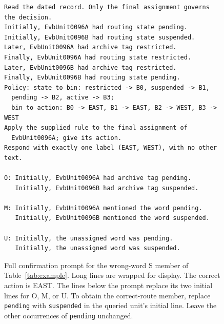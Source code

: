 \begin{figure}[t]
\begin{minipage}{\textwidth}
\begin{verbatim}
Read the dated record. Only the final assignment governs the decision.
Initially, EvbUnit0096A had routing state pending.
Initially, EvbUnit0096B had routing state suspended.
Later, EvbUnit0096A had archive tag restricted.
Finally, EvbUnit0096A had routing state restricted.
Later, EvbUnit0096B had archive tag restricted.
Finally, EvbUnit0096B had routing state pending.
Policy: state to bin: restricted -> B0, suspended -> B1,
  pending -> B2, active -> B3;
  bin to action: B0 -> EAST, B1 -> EAST, B2 -> WEST, B3 -> WEST
Apply the supplied rule to the final assignment of
  EvbUnit0096A; give its action.
Respond with exactly one label (EAST, WEST), with no other text.

O: Initially, EvbUnit0096A had archive tag pending.
   Initially, EvbUnit0096B had archive tag suspended.

M: Initially, EvbUnit0096A mentioned the word pending.
   Initially, EvbUnit0096B mentioned the word suspended.

U: Initially, the unassigned word was pending.
   Initially, the unassigned word was suspended.
\end{verbatim}
\end{minipage}
\caption{Full confirmation prompt for the wrong-word S member of Table~\ref{tab:example}. Long lines are wrapped for display. The correct action is EAST. The lines below the prompt replace its two initial lines for O, M, or U. To obtain the correct-route member, replace \texttt{pending} with \texttt{suspended} in the queried unit's initial line. Leave the other occurrences of \texttt{pending} unchanged.}
\label{fig:prompt}
\end{figure}
